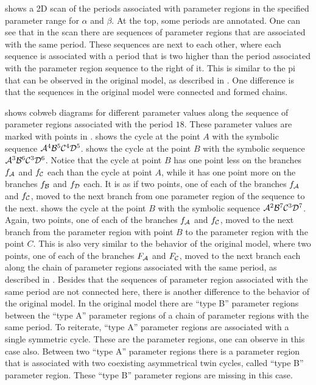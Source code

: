  shows a 2D scan of the periods associated with parameter regions in the specified parameter range for $\alpha$ and $\beta$.
At the top, some periods are annotated.
One can see that in the scan there are sequences of parameter regions that are associated with the same period.
These sequences are next to each other, where each sequence is associated with a period that is two higher than the period associated with the parameter region sequence to the right of it.
This is similar to the \gls{pi} that can be observed in the original model, as described in .
One difference is that the sequences in the original model were connected and formed chains.

 shows cobweb diagrams for different parameter values along the sequence of parameter regions associated with the period $18$.
These parameter values are marked with points in .
 shows the cycle at the point $A$ with the symbolic sequence $\mathcal{A}^4\mathcal{B}^5\mathcal{C}^4\mathcal{D}^5$.
 shows the cycle at the point $B$ with the symbolic sequence $\mathcal{A}^3\mathcal{B}^6\mathcal{C}^3\mathcal{D}^6$.
Notice that the cycle at point $B$ has one point less on the branches $f_{\mathcal{A}}$ and $f_{\mathcal{C}}$ each than the cycle at point $A$, while it has one point more on the branches $f_{\mathcal{B}}$ and $f_{\mathcal{D}}$ each.
It is as if two points, one of each of the branches $f_{\mathcal{A}}$ and $f_{\mathcal{C}}$, moved to the next branch from one parameter region of the sequence to the next.
 shows the cycle at the point $B$ with the symbolic sequence $\mathcal{A}^2\mathcal{B}^7\mathcal{C}^3\mathcal{D}^7$.
Again, two points, one of each of the branches $f_{\mathcal{A}}$ and $f_{\mathcal{C}}$, moved to the next branch from the parameter region with point $B$ to the parameter region with the point $C$.
This is also very similar to the behavior of the original model, where two points, one of each of the branches $F_{\mathcal{A}}$ and $F_{\mathcal{C}}$, moved to the next branch each along the chain of parameter regions associated with the same period, as described in .
Besides that the sequences of parameter region associated with the same period are not connected here, there is another difference to the behavior of the original model.
In the original model there are ``type B'' parameter regions between the ``type A'' parameter regions of a chain of parameter regions with the same period.
To reiterate, ``type A'' parameter regions are associated with a single symmetric cycle.
These are the parameter regions, one can observe in this case also.
Between two ``type A'' parameter regions there is a parameter region that is associated with two coexisting asymmetrical twin cycles, called ``type B'' parameter region.
These ``type B'' parameter regions are missing in this case.

